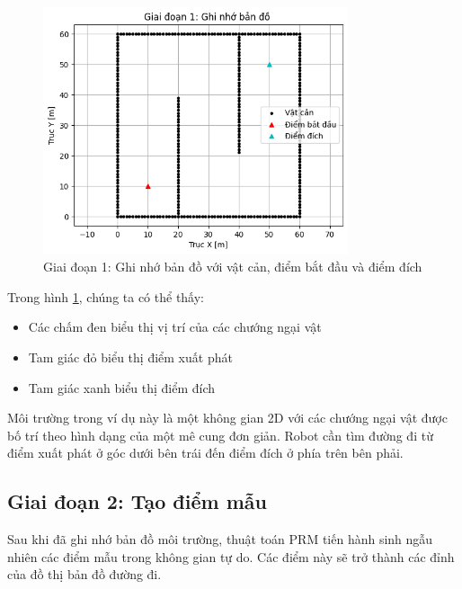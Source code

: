 \documentclass[12pt,a4paper,openany,oneside]{report}
\begin{document}
\begin{figure}[H]
    \centering
    \includegraphics[width=0.8\textwidth]{giai_doan_1}
    \caption{Giai đoạn 1: Ghi nhớ bản đồ với vật cản, điểm bắt đầu và điểm đích}
    \label{fig:stage1}
\end{figure}

Trong hình \ref{fig:stage1}, chúng ta có thể thấy:
\begin{itemize}
    \item Các chấm đen biểu thị vị trí của các chướng ngại vật
    \item Tam giác đỏ biểu thị điểm xuất phát
    \item Tam giác xanh biểu thị điểm đích
\end{itemize}

Môi trường trong ví dụ này là một không gian 2D với các chướng ngại vật được bố trí theo hình dạng của một mê cung đơn giản. Robot cần tìm đường đi từ điểm xuất phát ở góc dưới bên trái đến điểm đích ở phía trên bên phải.

\subsection{Giai đoạn 2: Tạo điểm mẫu}

Sau khi đã ghi nhớ bản đồ môi trường, thuật toán PRM tiến hành sinh ngẫu nhiên các điểm mẫu trong không gian tự do. Các điểm này sẽ trở thành các đỉnh của đồ thị bản đồ đường đi.
\end{document}
